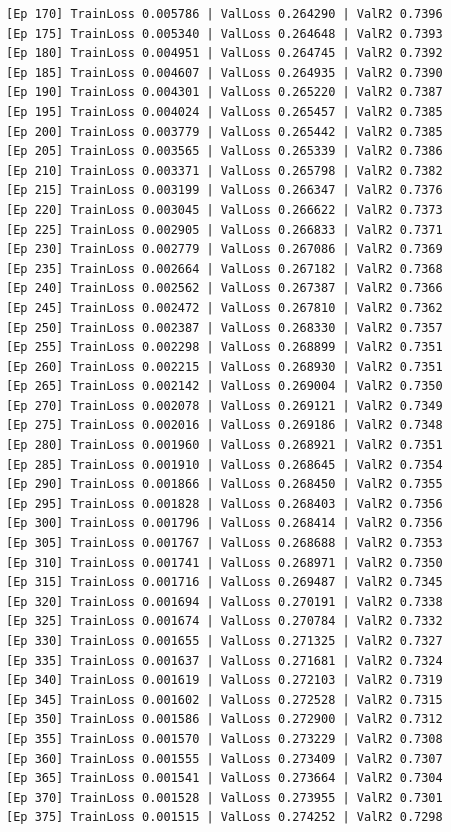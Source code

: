 \documentclass[a4paper, 12pt]{article}
\begin{document}
\begin{lstlisting}
[Ep 170] TrainLoss 0.005786 | ValLoss 0.264290 | ValR2 0.7396
[Ep 175] TrainLoss 0.005340 | ValLoss 0.264648 | ValR2 0.7393
[Ep 180] TrainLoss 0.004951 | ValLoss 0.264745 | ValR2 0.7392
[Ep 185] TrainLoss 0.004607 | ValLoss 0.264935 | ValR2 0.7390
[Ep 190] TrainLoss 0.004301 | ValLoss 0.265220 | ValR2 0.7387
[Ep 195] TrainLoss 0.004024 | ValLoss 0.265457 | ValR2 0.7385
[Ep 200] TrainLoss 0.003779 | ValLoss 0.265442 | ValR2 0.7385
[Ep 205] TrainLoss 0.003565 | ValLoss 0.265339 | ValR2 0.7386
[Ep 210] TrainLoss 0.003371 | ValLoss 0.265798 | ValR2 0.7382
[Ep 215] TrainLoss 0.003199 | ValLoss 0.266347 | ValR2 0.7376
[Ep 220] TrainLoss 0.003045 | ValLoss 0.266622 | ValR2 0.7373
[Ep 225] TrainLoss 0.002905 | ValLoss 0.266833 | ValR2 0.7371
[Ep 230] TrainLoss 0.002779 | ValLoss 0.267086 | ValR2 0.7369
[Ep 235] TrainLoss 0.002664 | ValLoss 0.267182 | ValR2 0.7368
[Ep 240] TrainLoss 0.002562 | ValLoss 0.267387 | ValR2 0.7366
[Ep 245] TrainLoss 0.002472 | ValLoss 0.267810 | ValR2 0.7362
[Ep 250] TrainLoss 0.002387 | ValLoss 0.268330 | ValR2 0.7357
[Ep 255] TrainLoss 0.002298 | ValLoss 0.268899 | ValR2 0.7351
[Ep 260] TrainLoss 0.002215 | ValLoss 0.268930 | ValR2 0.7351
[Ep 265] TrainLoss 0.002142 | ValLoss 0.269004 | ValR2 0.7350
[Ep 270] TrainLoss 0.002078 | ValLoss 0.269121 | ValR2 0.7349
[Ep 275] TrainLoss 0.002016 | ValLoss 0.269186 | ValR2 0.7348
[Ep 280] TrainLoss 0.001960 | ValLoss 0.268921 | ValR2 0.7351
[Ep 285] TrainLoss 0.001910 | ValLoss 0.268645 | ValR2 0.7354
[Ep 290] TrainLoss 0.001866 | ValLoss 0.268450 | ValR2 0.7355
[Ep 295] TrainLoss 0.001828 | ValLoss 0.268403 | ValR2 0.7356
[Ep 300] TrainLoss 0.001796 | ValLoss 0.268414 | ValR2 0.7356
[Ep 305] TrainLoss 0.001767 | ValLoss 0.268688 | ValR2 0.7353
[Ep 310] TrainLoss 0.001741 | ValLoss 0.268971 | ValR2 0.7350
[Ep 315] TrainLoss 0.001716 | ValLoss 0.269487 | ValR2 0.7345
[Ep 320] TrainLoss 0.001694 | ValLoss 0.270191 | ValR2 0.7338
[Ep 325] TrainLoss 0.001674 | ValLoss 0.270784 | ValR2 0.7332
[Ep 330] TrainLoss 0.001655 | ValLoss 0.271325 | ValR2 0.7327
[Ep 335] TrainLoss 0.001637 | ValLoss 0.271681 | ValR2 0.7324
[Ep 340] TrainLoss 0.001619 | ValLoss 0.272103 | ValR2 0.7319
[Ep 345] TrainLoss 0.001602 | ValLoss 0.272528 | ValR2 0.7315
[Ep 350] TrainLoss 0.001586 | ValLoss 0.272900 | ValR2 0.7312
[Ep 355] TrainLoss 0.001570 | ValLoss 0.273229 | ValR2 0.7308
[Ep 360] TrainLoss 0.001555 | ValLoss 0.273409 | ValR2 0.7307
[Ep 365] TrainLoss 0.001541 | ValLoss 0.273664 | ValR2 0.7304
[Ep 370] TrainLoss 0.001528 | ValLoss 0.273955 | ValR2 0.7301
[Ep 375] TrainLoss 0.001515 | ValLoss 0.274252 | ValR2 0.7298

\end{lstlisting}
\end{document}
